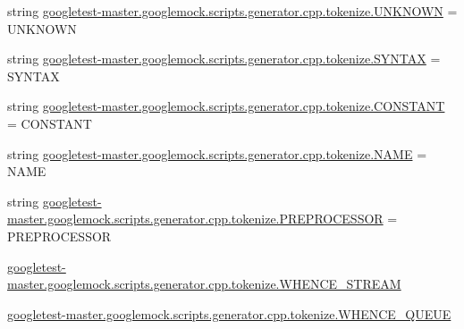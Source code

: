 \begin{DoxyCompactItemize}
\item 
string \mbox{\hyperlink{namespacegoogletest-master_1_1googlemock_1_1scripts_1_1generator_1_1cpp_1_1tokenize_a41a82ba5380dea9ff0f3f69a91fb307e}{googletest-\/master.\+googlemock.\+scripts.\+generator.\+cpp.\+tokenize.\+U\+N\+K\+N\+O\+WN}} = \textquotesingle{}U\+N\+K\+N\+O\+WN\textquotesingle{}
\item 
string \mbox{\hyperlink{namespacegoogletest-master_1_1googlemock_1_1scripts_1_1generator_1_1cpp_1_1tokenize_a81e0b12fd2645acf961e2e007c3f3330}{googletest-\/master.\+googlemock.\+scripts.\+generator.\+cpp.\+tokenize.\+S\+Y\+N\+T\+AX}} = \textquotesingle{}S\+Y\+N\+T\+AX\textquotesingle{}
\item 
string \mbox{\hyperlink{namespacegoogletest-master_1_1googlemock_1_1scripts_1_1generator_1_1cpp_1_1tokenize_aa7c7fcc4418ba66bfa95cd4547f527f4}{googletest-\/master.\+googlemock.\+scripts.\+generator.\+cpp.\+tokenize.\+C\+O\+N\+S\+T\+A\+NT}} = \textquotesingle{}C\+O\+N\+S\+T\+A\+NT\textquotesingle{}
\item 
string \mbox{\hyperlink{namespacegoogletest-master_1_1googlemock_1_1scripts_1_1generator_1_1cpp_1_1tokenize_a4a834eb514e1aa082fe4e8cbe728006c}{googletest-\/master.\+googlemock.\+scripts.\+generator.\+cpp.\+tokenize.\+N\+A\+ME}} = \textquotesingle{}N\+A\+ME\textquotesingle{}
\item 
string \mbox{\hyperlink{namespacegoogletest-master_1_1googlemock_1_1scripts_1_1generator_1_1cpp_1_1tokenize_a0d7b3e030824bf2a9d8f43e4d62e400d}{googletest-\/master.\+googlemock.\+scripts.\+generator.\+cpp.\+tokenize.\+P\+R\+E\+P\+R\+O\+C\+E\+S\+S\+OR}} = \textquotesingle{}P\+R\+E\+P\+R\+O\+C\+E\+S\+S\+OR\textquotesingle{}
\item 
\mbox{\hyperlink{namespacegoogletest-master_1_1googlemock_1_1scripts_1_1generator_1_1cpp_1_1tokenize_a8adeb14ae627036f5fa4fa611e56342a}{googletest-\/master.\+googlemock.\+scripts.\+generator.\+cpp.\+tokenize.\+W\+H\+E\+N\+C\+E\+\_\+\+S\+T\+R\+E\+AM}}
\item 
\mbox{\hyperlink{namespacegoogletest-master_1_1googlemock_1_1scripts_1_1generator_1_1cpp_1_1tokenize_a6988dccaed652b3c9fa5d4716dde1dc9}{googletest-\/master.\+googlemock.\+scripts.\+generator.\+cpp.\+tokenize.\+W\+H\+E\+N\+C\+E\+\_\+\+Q\+U\+E\+UE}}
\end{DoxyCompactItemize}
